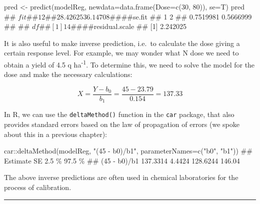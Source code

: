 \documentclass[a4paper,12pt,oneside]{book}
\newenvironment{Shaded}{\begin{snugshade}}{\end{snugshade}}
\newcommand{\DecValTok}[1]{#1}
\newcommand{\SpecialCharTok}[1]{#1}
\newcommand{\StringTok}[1]{#1}
\newcommand{\DocumentationTok}[1]{#1}
\newcommand{\OtherTok}[1]{#1}
\newcommand{\FunctionTok}[1]{#1}
\newcommand{\AttributeTok}[1]{#1}
\newcommand{\NormalTok}[1]{#1}
\begin{document}
\begin{Shaded}
\begin{Highlighting}[]
\NormalTok{pred }\OtherTok{\textless{}{-}} \FunctionTok{predict}\NormalTok{(modelReg, }\AttributeTok{newdata=}\FunctionTok{data.frame}\NormalTok{(}\AttributeTok{Dose=}\FunctionTok{c}\NormalTok{(}\DecValTok{30}\NormalTok{, }\DecValTok{80}\NormalTok{)), }\AttributeTok{se=}\NormalTok{T)}
\NormalTok{pred}
\DocumentationTok{\#\# $fit}
\DocumentationTok{\#\#        1        2 }
\DocumentationTok{\#\# 28.42625 36.14708 }
\DocumentationTok{\#\# }
\DocumentationTok{\#\# $se.fit}
\DocumentationTok{\#\#         1         2 }
\DocumentationTok{\#\# 0.7519981 0.5666999 }
\DocumentationTok{\#\# }
\DocumentationTok{\#\# $df}
\DocumentationTok{\#\# [1] 14}
\DocumentationTok{\#\# }
\DocumentationTok{\#\# $residual.scale}
\DocumentationTok{\#\# [1] 2.242025}
\end{Highlighting}
\end{Shaded}

It is also useful to make inverse prediction, i.e.~to calculate the dose giving a certain response level. For example, we may wonder what N dose we need to obtain a yield of 4.5 q ha\textsuperscript{-1}. To determine this, we need to solve the model for the dose and make the necessary calculations:

\[X = \frac{Y - b_0}{b_1} = \frac{45 - 23.79}{0.154} = 137.33\]

In R, we can use the \texttt{deltaMethod()} function in the \texttt{car} package, that also provides standard errors based on the law of propagation of errors (we spoke about this in a previous chapter):

\begin{Shaded}
\begin{Highlighting}[]
\NormalTok{car}\SpecialCharTok{::}\FunctionTok{deltaMethod}\NormalTok{(modelReg, }\StringTok{"(45 {-} b0)/b1"}\NormalTok{, }
                 \AttributeTok{parameterNames=}\FunctionTok{c}\NormalTok{(}\StringTok{"b0"}\NormalTok{, }\StringTok{"b1"}\NormalTok{))}
\DocumentationTok{\#\#              Estimate       SE    2.5 \% 97.5 \%}
\DocumentationTok{\#\# (45 {-} b0)/b1 137.3314   4.4424 128.6244 146.04}
\end{Highlighting}
\end{Shaded}

The above inverse predictions are often used in chemical laboratories for the process of calibration.

\begin{center}\rule{0.5\linewidth}{0.5pt}\end{center}
\end{document}
